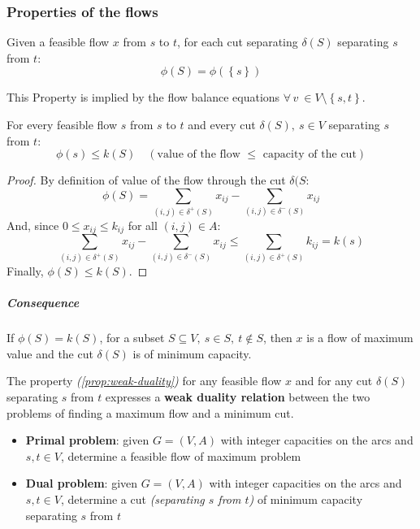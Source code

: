 \documentclass[english]{article}
\begin{document}
\subsubsection{Properties of the flows}
\begin{property}
  Given a feasible flow \(x\) from \(s\) to \(t\), for each cut separating \(\delta(S)\) separating \(s\) from \(t\):
  \[ \phi(S) = \phi\left( \left\{ s \right\} \right) \]

  This Property is implied by the flow balance equations \(\forall \, v \ \in V \setminus \left\{ s, t \right\}\).
\end{property}

\bigskip
\begin{property}
  \label{prop:weak-duality}
  For every feasible flow \(s\) from \(s\) to \(t\) and every cut \(\delta(S), \ s \in V\) separating \(s\) from \(t\):
  \[ \phi(s) \leq k(S) \quad \left( \text{value of the flow } \leq \text{ capacity of the cut} \right)\]
\end{property}

\begin{proof}
  By definition of value of the flow through the cut \(\delta(S\):
  \[ \phi(S) = \displaystyle \sum_{\left( i, j \right) \in \delta^+(S)} x_{ij} - \sum_{\left( i, j \right) \in \delta^-(S)} x_{ij} \]
  And, since \(0 \leq x_{ij} \leq k_{ij}\) for all \(\left( i, j \right) \in A\):
  \[ \displaystyle \sum_{\left( i, j \right) \in \delta^+(S)} x_{ij} - \sum_{\left( i, j \right) \in \delta^-(S)} x_{ij} \leq \displaystyle \sum_{\left( i, j \right) \in \delta^+(S)} k_{ij} = k(s) \]
  Finally, \(\phi(S) \leq k(S)\).
\end{proof}

\subparagraph*{Consequence}
If \(\phi(S) = k(S)\), for a subset \(S \subseteq V, \ s \in S, \ t \notin S\), then \(x\) is a flow of maximum value and the cut \(\delta(S)\) is of minimum capacity.

The property \textit{(\ref{prop:weak-duality})} for any feasible flow \(x\) and for any cut \(\delta(S)\) separating \(s\) from \(t\) expresses a \textbf{weak duality relation} between the two problems of finding a maximum flow and a minimum cut.

\begin{itemize}
  \item \textbf{Primal problem}: given \(G = (V, A)\) with integer capacities on the arcs and \(s, t \in V\), determine a feasible flow of maximum problem
  \item \textbf{Dual problem}: given \(G = (V, A)\) with integer capacities on the arcs and \(s, t \in V\), determine a cut \textit{(separating \(s\) from \(t\))} of minimum capacity separating \(s\) from \(t\)
\end{itemize}
\end{document}
